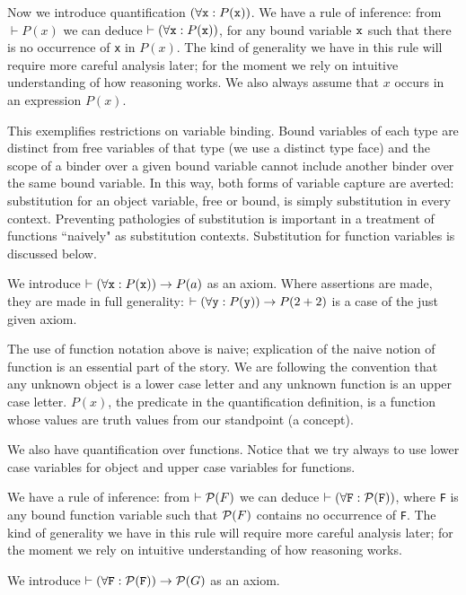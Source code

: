 \documentclass[12pt]{article}
\begin{document}
Now we introduce quantification $(\forall {\tt x}:P({\tt x}))$.  We have a rule of inference:  from $\vdash P(x)$ we can deduce $\vdash (\forall {\tt x}:P({\tt x}))$, for any bound variable ${\tt x}$ such that there is no occurrence
of {\tt x} in $P(x)$.  The kind of generality we have in this rule
will require more careful analysis later; for the moment we rely on intuitive understanding of how reasoning works.  We also always assume that $x$ occurs in an expression $P(x)$.

This exemplifies restrictions on variable binding.  Bound variables of each type are distinct from free variables of that type (we use a distinct type face) and the scope of a binder over a given bound variable cannot include another binder over the same bound variable.  In this way, both forms of variable capture are averted:  substitution for an object variable, free or bound, is simply substitution in every context.  Preventing pathologies of substitution is important in a treatment of functions ``naively" as substitution contexts.  Substitution for function variables is discussed below.

We introduce $\vdash (\forall {\tt x}:P({\tt x})) \rightarrow P(a)$ as an axiom.  Where assertions are made, they are made in full generality:  $\vdash (\forall {\tt y}:P({\tt y})) \rightarrow P(2+2)$ is a case of the just given axiom.

The use of function notation above is naive;  explication of the naive notion of function is an essential part of the story.  We are following the convention that any unknown
object is a lower case letter and any unknown function is an upper case letter.  $P(x)$, the predicate in the quantification definition, is a function whose values are truth values from our standpoint (a concept).

We also have quantification over functions.  Notice that we try always to use lower case variables for object and upper case variables for functions.

We have a rule of inference:  from $\vdash {\cal P}(F)$ we can deduce $\vdash (\forall {\tt F}:{\cal P}({\tt F}))$, where {\tt F} is any bound function variable such that ${\cal P}(F)$ contains no occurrence of {\tt F}.
The kind of generality we have in this rule
will require more careful analysis later; for the moment we rely on intuitive understanding of how reasoning works.

We introduce $\vdash (\forall {\tt F}:{\cal P}({\tt F})) \rightarrow {\cal P}(G)$ as an axiom.
\end{document}
